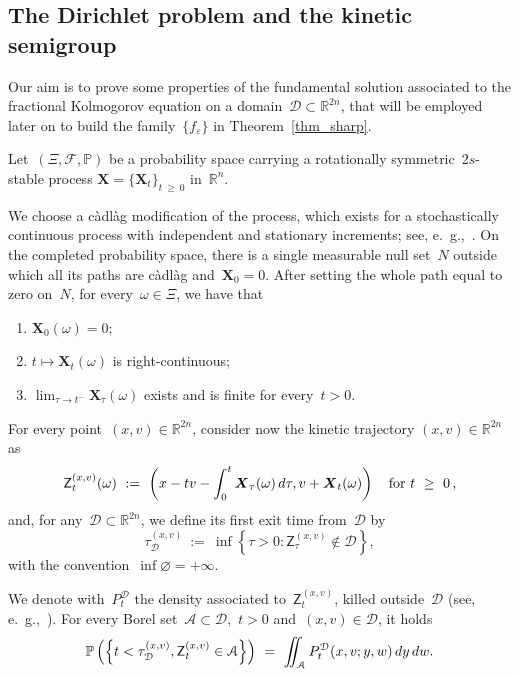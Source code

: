 \documentclass[leqno,10pt]{amsart}
\theoremstyle{plain}
\theoremstyle{remark}
\numberwithin{equation}{section}
\def \d{\,{\rm d}}
\def\er{\mathbb{R}}
\def\ern{\mathbb{R}^n}
\newcommand{\Ac}{\mathcal{A}}
\newcommand{\Zs}{\mathsf{Z}}
\newcommand{\Xb}{\boldsymbol{X}}
\newcommand{\eps}{\varepsilon}
\begin{document}
{\subsection{The Dirichlet problem and the kinetic semigroup}\label{psharp:subsec_kernel}
Our aim is to prove some 
 properties of the fundamental solution associated to the fractional Kolmogorov equation on a domain~$\mathcal{D} \subset \mathbb{R}^{2n}$, that will be employed later on to build the family~$\{f_\eps\}$ in Theorem~\ref{thm_sharp}.
 
 \vspace{2mm}
 Let~$(\Xi,\mathcal{F},\mathbb{P})$ be a probability space carrying a rotationally symmetric~$2s$-stable process
$\Xb=\{\Xb_t\}_{t\ \geq\ 0}$ in~$\ern$.

We choose a c\`adl\`ag modification of the process, which exists
for a stochastically continuous process with independent and stationary
increments; see, e.~\!g.,~\cite[Chapter~2 and the discussion following Formula~(2.3)]{Sch14}. 
On the completed probability space, there is a single measurable null set~$N$ outside which all its paths are c\`adl\`ag and~$\Xb_0=0$. After setting
the whole path equal to zero on~$N$, for every~$\omega\in\Xi$,  we have that 
\begin{enumerate}[\it (i)]
\item $\Xb_0(\omega)=0$;
\item $t\mapsto\Xb_t(\omega)$ is right-continuous;
\item $\lim_{\tau\to t^-}\Xb_\tau(\omega)$ exists and is finite
for every~$t>0$.
\end{enumerate}

For every point~$(x,v)\in\er^{2n}$, consider now the kinetic trajectory
$(x,v)\in\er^{2n}$ as
\[
\Zs_t^{(x,v)}(\omega) \ := \  \left(x-tv-\int_0^t\Xb_\tau(\omega)\d\tau,v+\Xb_t(\omega)\right) \quad \text{for}~t\ \geq\ 0\,,
\]
and, for any~$\mathcal{D} \subset \er^{2n}$,  we define its first exit
time from~$\mathcal{D}$ by
\[
\tau_{\mathcal{D}}^{(x,v)} \ := \ \inf\left\{\tau>0: \Zs_\tau^{(x,v)}\notin \mathcal{D} \right\},
\]
with the convention~$\inf\varnothing=+\infty$.

We denote with~$P_t^{\mathcal{D}}$ the density associated to~$\Zs^{(x,v)}_t$, killed outside~$\mathcal{D}$ (see, e.~\!g.,~\cite[Section~2]{KW24c}). For every
Borel set~$\Ac \subset \mathcal{D}$,~$t>0$ and~$(x,v)\in \mathcal{D}$, it holds
\begin{equation}\label{eq:density-identity}
\mathbb{P}\left(\left\{t<\tau_{\mathcal{D}}^{(x,v)},
\Zs_t^{(x,v)}\in \Ac\right\}\right)
\ = \ \iint_{\Ac}P_t^{\mathcal{D}}(x,v;y,w)\d y\d w.
\end{equation}



}
\end{document}
